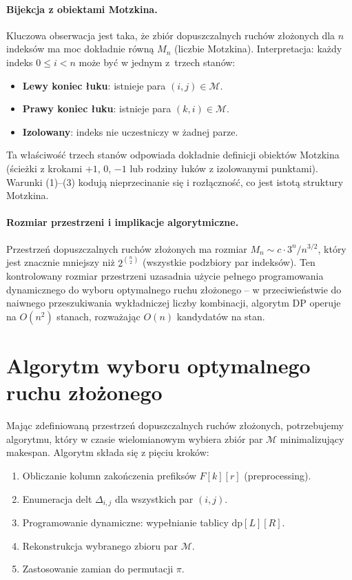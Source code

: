 \paragraph{Bijekcja z obiektami Motzkina.}
Kluczowa obserwacja jest taka, że zbiór dopuszczalnych ruchów złożonych dla $n$ indeksów ma moc dokładnie równą $M_n$ (liczbie Motzkina). Interpretacja: każdy indeks $0 \le i < n$ może być w jednym z~trzech stanów:
\begin{itemize}
  \item \textbf{Lewy koniec łuku}: istnieje para $(i,j) \in \mathcal{M}$.
  \item \textbf{Prawy koniec łuku}: istnieje para $(k,i) \in \mathcal{M}$.
  \item \textbf{Izolowany}: indeks nie uczestniczy w żadnej parze.
\end{itemize}
Ta właściwość trzech stanów odpowiada dokładnie definicji obiektów Motzkina (ścieżki z krokami $+1$, $0$, $-1$ lub rodziny łuków z izolowanymi punktami). Warunki (1)–(3) kodują nieprzecinanie się i rozłączność, co jest istotą struktury Motzkina.

\paragraph{Rozmiar przestrzeni i implikacje algorytmiczne.}
Przestrzeń dopuszczalnych ruchów złożonych ma rozmiar $M_n \sim c \cdot 3^n / n^{3/2}$, który jest znacznie mniejszy niż $2^{\binom{n}{2}}$ (wszystkie podzbiory par indeksów). Ten kontrolowany rozmiar przestrzeni uzasadnia użycie pełnego programowania dynamicznego do wyboru optymalnego ruchu złożonego -- w przeciwieństwie do naiwnego przeszukiwania wykładniczej liczby kombinacji, algorytm DP operuje na $O(n^2)$ stanach, rozważając $O(n)$ kandydatów na stan.


\section[Algorytm wyboru optymalnego \ldots]{Algorytm wyboru optymalnego ruchu złożonego}

Mając zdefiniowaną przestrzeń dopuszczalnych ruchów złożonych, potrzebujemy algorytmu, który w czasie wielomianowym wybiera zbiór par $\mathcal{M}$ minimalizujący makespan. Algorytm składa się z pięciu kroków:
\begin{enumerate}
  \item Obliczanie kolumn zakończenia prefiksów $F[k][r]$ (preprocessing).
  \item Enumeracja delt $\Delta_{i,j}$ dla wszystkich par $(i,j)$.
  \item Programowanie dynamiczne: wypełnianie tablicy $\mathrm{dp}[L][R]$.
  \item Rekonstrukcja wybranego zbioru par $\mathcal{M}$.
  \item Zastosowanie zamian do permutacji $\pi$.
\end{enumerate}


